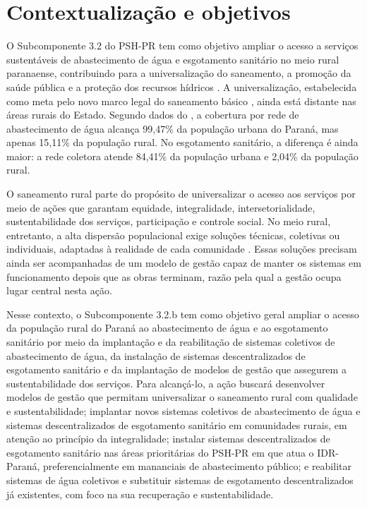 \section{Contextualização e objetivos}
\label{sec:contexto}

O Subcomponente 3.2 do PSH-PR tem como objetivo ampliar o acesso a serviços
sustentáveis de abastecimento de água e esgotamento sanitário no meio rural
paranaense, contribuindo para a universalização do saneamento, a promoção da
saúde pública e a proteção dos recursos hídricos \cite{mop2026}. A
universalização, estabelecida como meta pelo novo marco legal do saneamento
básico \cite{lei14026}, ainda está distante nas áreas rurais do Estado.
Segundo dados do , a cobertura por rede de
abastecimento de água alcança 99,47\% da população urbana do Paraná, mas
apenas 15,11\% da população rural. No esgotamento sanitário, a diferença é
ainda maior: a rede coletora atende 84,41\% da população urbana e 2,04\% da
população rural.

O saneamento rural parte do propósito de universalizar o acesso aos serviços
por meio de ações que garantam equidade, integralidade, intersetorialidade,
sustentabilidade dos serviços, participação e controle social. No meio rural,
entretanto, a alta dispersão populacional exige soluções técnicas, coletivas
ou individuais, adaptadas à realidade de cada comunidade \cite{mop2026}.
Essas soluções precisam ainda ser acompanhadas de um modelo de gestão capaz
de manter os sistemas em funcionamento depois que as obras terminam, razão
pela qual a gestão ocupa lugar central nesta ação.


Nesse contexto, o Subcomponente 3.2.b tem como objetivo geral ampliar o
acesso da população rural do Paraná ao abastecimento de água e ao
esgotamento sanitário por meio da implantação e da reabilitação de sistemas
coletivos de abastecimento de água, da instalação de sistemas
descentralizados de esgotamento sanitário e da implantação de modelos de
gestão que assegurem a sustentabilidade dos serviços. Para alcançá-lo, a ação
buscará desenvolver modelos de gestão que permitam universalizar o saneamento
rural com qualidade e sustentabilidade; implantar novos sistemas coletivos de
abastecimento de água e sistemas descentralizados de esgotamento sanitário
em comunidades rurais, em atenção ao princípio da integralidade; instalar
sistemas descentralizados de esgotamento sanitário nas áreas prioritárias do
PSH-PR em que atua o IDR-Paraná, preferencialmente em mananciais de
abastecimento público; e reabilitar sistemas de água coletivos e substituir
sistemas de esgotamento descentralizados já existentes, com foco na sua
recuperação e sustentabilidade.

